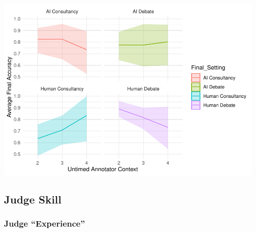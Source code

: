 \documentclass[
]{article}
\begin{document}
\includegraphics[width=1\linewidth]{debate-2309_files/figure-latex/Accuracy by Context Graph-3}

\hypertarget{judge-skill}{%
\subsection{Judge Skill}\label{judge-skill}}

\hypertarget{judge-experience}{%
\subsubsection{Judge ``Experience''}\label{judge-experience}}
\end{document}
